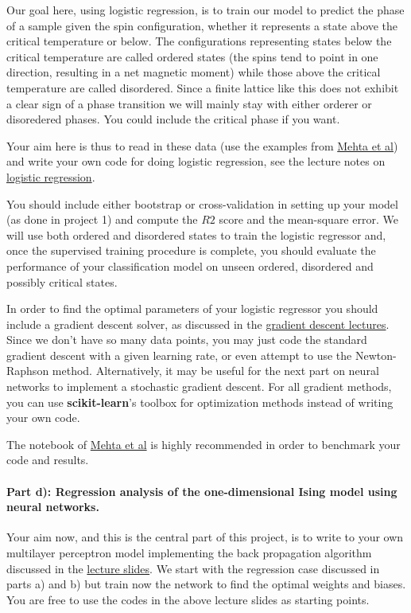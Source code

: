 \documentclass[%
oneside,                 %
final,                   %
10pt]{article}
\begin{document}
Our goal here, using logistic regression, is to train our model to
predict the phase of a sample given the spin configuration, whether it
represents a state above the critical temperature or below.  The
configurations representing states below the critical temperature are
called ordered states (the spins tend to point in one direction,
resulting in a net magnetic moment) while those above the critical
temperature are called disordered. Since a finite lattice like this
does not exhibit a clear sign of a phase transition we will mainly
stay with either orderer or disoredered phases. You could include the
critical phase if you want.


Your aim here is thus to read in these data (use the examples from
\href{{https://physics.bu.edu/~pankajm/ML-Notebooks/HTML/NB_CVII-logreg_ising.html}}{Mehta et
al})
and write your own code for doing logistic regression, see the lecture
notes on \href{{https://compphysics.github.io/MachineLearning/doc/pub/LogReg/html/LogReg-bs.html}}{logistic
regression}.

You should include either bootstrap or cross-validation in setting up
your model (as done in project 1) and compute the $R2$ score and the
mean-square error.
We will use both ordered and disordered states to train
the logistic regressor and, once the supervised training procedure is
complete, you should  evaluate the performance of your classification model on
unseen ordered, disordered and possibly critical states.  



In order to find the optimal parameters of your logistic regressor you should
include a gradient descent solver, as discussed in the \href{{https://compphysics.github.io/MachineLearning/doc/pub/Splines/html/Splines-bs.html}}{gradient
descent
lectures}.
Since we don't have so many data points, you may just code the
standard gradient descent with a given learning rate, or even attempt
to use the Newton-Raphson method.  Alternatively, it may be useful for
the next part on neural networks to implement a stochastic gradient
descent. For all  gradient methods, you can use \textbf{scikit-learn}'s toolbox for
optimization methods instead of writing your own code.


The notebook of \href{{https://physics.bu.edu/~pankajm/ML-Notebooks/HTML/NB_CVII-logreg_ising.html}}{Mehta et al} is highly recommended in order to benchmark your code and results.

\paragraph{Part d): Regression analysis of the one-dimensional Ising model using neural networks.}
Your aim now, and this is the central part of this project, is to
write to your own multilayer perceptron model implementing the back
propagation algorithm discussed in the \href{{https://compphysics.github.io/MachineLearning/doc/pub/NeuralNet/html/NeuralNet-bs.html}}{lecture
slides}. We
start with the regression case discussed in parts a) and b) but train
now the network to find the optimal weights and biases. You are free
to use the codes in the above lecture slides as starting points.
\end{document}
